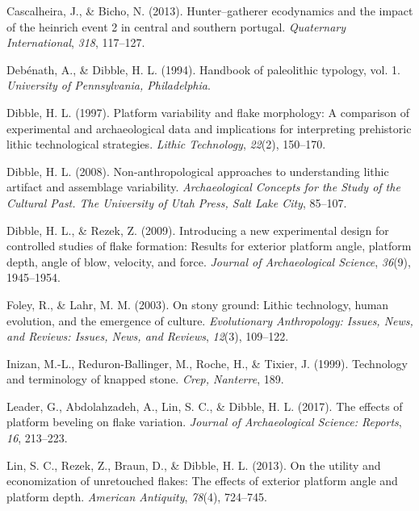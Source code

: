 \documentclass[12pt,twoside]{reedthesis}
\begin{document}
\leavevmode\hypertarget{ref-cascalheiraandbicho2013}{}%
Cascalheira, J., \& Bicho, N. (2013). Hunter--gatherer ecodynamics and the impact of the heinrich event 2 in central and southern portugal. \emph{Quaternary International}, \emph{318}, 117--127.

\leavevmode\hypertarget{ref-debenath1994}{}%
Debénath, A., \& Dibble, H. L. (1994). Handbook of paleolithic typology, vol. 1. \emph{University of Pennsylvania, Philadelphia}.

\leavevmode\hypertarget{ref-dibble1997}{}%
Dibble, H. L. (1997). Platform variability and flake morphology: A comparison of experimental and archaeological data and implications for interpreting prehistoric lithic technological strategies. \emph{Lithic Technology}, \emph{22}(2), 150--170.

\leavevmode\hypertarget{ref-dibble2008}{}%
Dibble, H. L. (2008). Non-anthropological approaches to understanding lithic artifact and assemblage variability. \emph{Archaeological Concepts for the Study of the Cultural Past. The University of Utah Press, Salt Lake City}, 85--107.

\leavevmode\hypertarget{ref-dibble2009}{}%
Dibble, H. L., \& Rezek, Z. (2009). Introducing a new experimental design for controlled studies of flake formation: Results for exterior platform angle, platform depth, angle of blow, velocity, and force. \emph{Journal of Archaeological Science}, \emph{36}(9), 1945--1954.

\leavevmode\hypertarget{ref-foley2003}{}%
Foley, R., \& Lahr, M. M. (2003). On stony ground: Lithic technology, human evolution, and the emergence of culture. \emph{Evolutionary Anthropology: Issues, News, and Reviews: Issues, News, and Reviews}, \emph{12}(3), 109--122.

\leavevmode\hypertarget{ref-inizan1999}{}%
Inizan, M.-L., Reduron-Ballinger, M., Roche, H., \& Tixier, J. (1999). Technology and terminology of knapped stone. \emph{Crep, Nanterre}, 189.

\leavevmode\hypertarget{ref-leader2017}{}%
Leader, G., Abdolahzadeh, A., Lin, S. C., \& Dibble, H. L. (2017). The effects of platform beveling on flake variation. \emph{Journal of Archaeological Science: Reports}, \emph{16}, 213--223.

\leavevmode\hypertarget{ref-linetal2013}{}%
Lin, S. C., Rezek, Z., Braun, D., \& Dibble, H. L. (2013). On the utility and economization of unretouched flakes: The effects of exterior platform angle and platform depth. \emph{American Antiquity}, \emph{78}(4), 724--745.
\end{document}
